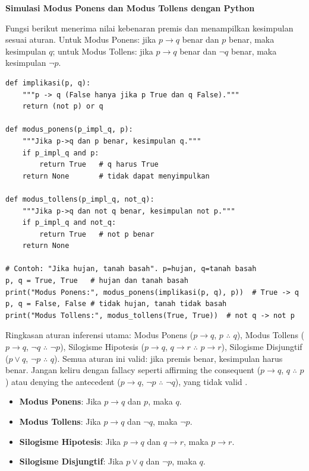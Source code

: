 \begin{contoh}
\textbf{Simulasi Modus Ponens dan Modus Tollens dengan Python} \cite{python_docs_boolean,rosen2019}

Fungsi berikut menerima nilai kebenaran premis dan menampilkan kesimpulan sesuai aturan. Untuk Modus Ponens: jika $p \to q$ benar dan $p$ benar, maka kesimpulan $q$; untuk Modus Tollens: jika $p \to q$ benar dan $\neg q$ benar, maka kesimpulan $\neg p$.

\begin{lstlisting}[style=pythonstyle, caption={Pengecekan kesimpulan Modus Ponens dan Modus Tollens}]
def implikasi(p, q):
    """p -> q (False hanya jika p True dan q False)."""
    return (not p) or q

def modus_ponens(p_impl_q, p):
    """Jika p->q dan p benar, kesimpulan q."""
    if p_impl_q and p:
        return True   # q harus True
    return None       # tidak dapat menyimpulkan

def modus_tollens(p_impl_q, not_q):
    """Jika p->q dan not q benar, kesimpulan not p."""
    if p_impl_q and not_q:
        return True   # not p benar
    return None

# Contoh: "Jika hujan, tanah basah". p=hujan, q=tanah basah
p, q = True, True   # hujan dan tanah basah
print("Modus Ponens:", modus_ponens(implikasi(p, q), p))  # True -> q
p, q = False, False # tidak hujan, tanah tidak basah
print("Modus Tollens:", modus_tollens(True, True))  # not q -> not p
\end{lstlisting}
\end{contoh}

\begin{konsep}
Ringkasan aturan inferensi utama: Modus Ponens ($p \rightarrow q$, $p$ $\therefore$ $q$), Modus Tollens ($p \rightarrow q$, $\neg q$ $\therefore$ $\neg p$), Silogisme Hipotesis ($p \rightarrow q$, $q \rightarrow r$ $\therefore$ $p \rightarrow r$), Silogisme Disjungtif ($p \vee q$, $\neg p$ $\therefore$ $q$). Semua aturan ini valid: jika premis benar, kesimpulan harus benar. Jangan keliru dengan fallacy seperti affirming the consequent ($p \rightarrow q$, $q$ $\therefore$ $p$) atau denying the antecedent ($p \rightarrow q$, $\neg p$ $\therefore$ $\neg q$), yang tidak valid \cite{mit_proof_methods,brilliant_rules_inference}.
\end{konsep}

\begin{itemize}
  \item \textbf{Modus Ponens}: Jika $p \rightarrow q$ dan $p$, maka $q$.
  \item \textbf{Modus Tollens}: Jika $p \rightarrow q$ dan $\neg q$, maka $\neg p$.
  \item \textbf{Silogisme Hipotesis}: Jika $p \rightarrow q$ dan $q \rightarrow r$, maka $p \rightarrow r$.
  \item \textbf{Silogisme Disjungtif}: Jika $p \vee q$ dan $\neg p$, maka $q$.
\end{itemize}
